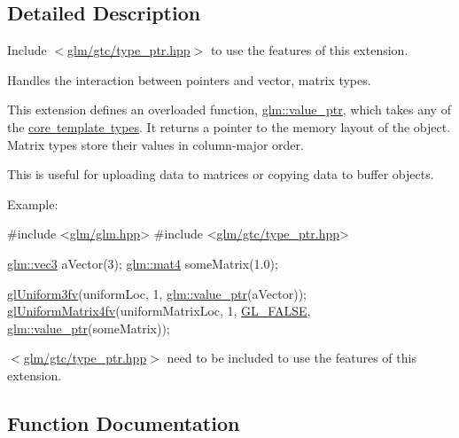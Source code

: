 \subsection{Detailed Description}
Include $<$\mbox{\hyperlink{type__ptr_8hpp}{glm/gtc/type\+\_\+ptr.\+hpp}}$>$ to use the features of this extension.

Handles the interaction between pointers and vector, matrix types.

This extension defines an overloaded function, \mbox{\hyperlink{group__gtc__type__ptr_ga1c64669e1ba1160ad9386e43dc57569a}{glm\+::value\+\_\+ptr}}, which takes any of the \mbox{\hyperlink{group__core__template}{core template types}}. It returns a pointer to the memory layout of the object. Matrix types store their values in column-\/major order.

This is useful for uploading data to matrices or copying data to buffer objects.

Example\+: 
\begin{DoxyCode}
\textcolor{preprocessor}{#include <\mbox{\hyperlink{glm_8hpp}{glm/glm.hpp}}>}
\textcolor{preprocessor}{#include <\mbox{\hyperlink{type__ptr_8hpp}{glm/gtc/type\_ptr.hpp}}>}

\mbox{\hyperlink{structglm_1_1vec}{glm::vec3}} aVector(3);
\mbox{\hyperlink{structglm_1_1mat}{glm::mat4}} someMatrix(1.0);

\mbox{\hyperlink{_s_d_l__opengles2__gl2_8h_a991515844544ee1e7f352b84664d81be}{glUniform3fv}}(uniformLoc, 1, \mbox{\hyperlink{group__gtc__type__ptr_ga1c64669e1ba1160ad9386e43dc57569a}{glm::value\_ptr}}(aVector));
\mbox{\hyperlink{_s_d_l__opengles2__gl2_8h_af5b4b100bbe8284da6f00415c9687d62}{glUniformMatrix4fv}}(uniformMatrixLoc, 1, \mbox{\hyperlink{glew_8h_abca6d43f43fae31f49dcb883b2f301f6}{GL\_FALSE}}, 
      \mbox{\hyperlink{group__gtc__type__ptr_ga1c64669e1ba1160ad9386e43dc57569a}{glm::value\_ptr}}(someMatrix));
\end{DoxyCode}


$<$\mbox{\hyperlink{type__ptr_8hpp}{glm/gtc/type\+\_\+ptr.\+hpp}}$>$ need to be included to use the features of this extension. 

\subsection{Function Documentation}
\mbox{\label{group__gtc__type__ptr_ga04409e74dc3da251d2501acf5b4b546c}} 
